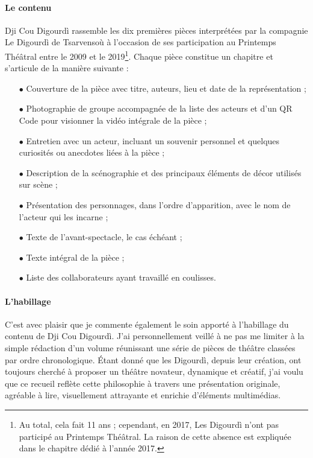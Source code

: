 \paragraph*{Le contenu}
Dji Cou Digourdì rassemble les dix premières pièces interprétées par la compagnie Le Digourdì de Tsarvensoù à l'occasion de ses participation au Printemps Thé\^atral entre le 2009 et le 2019\footnote{ Au total, cela fait 11 ans ; cependant, en 2017, Les Digourdì n'ont pas participé au Printemps Thé\^atral. La raison de cette absence est expliquée dans le chapitre dédié à l'année 2017.}. Chaque pièce constitue un chapitre et s'articule de la manière suivante :
\begin{itemize}
\item[$\bullet$] Couverture de la pièce avec titre, auteurs, lieu et date de la représentation ;
\item[$\bullet$] Photographie de groupe accompagnée de la liste des acteurs et d'un QR Code pour visionner la vidéo intégrale de la pièce ;
\item[$\bullet$] Entretien avec un acteur, incluant un souvenir personnel et quel\-ques curiosités ou anecdotes liées à la pièce ;
\item[$\bullet$] Description de la scénographie et des principaux éléments de décor utilisés sur scène ;
\item[$\bullet$] Présentation des personnages, dans l’ordre d’apparition, avec le nom de l’acteur qui les incarne ;
\item[$\bullet$] Texte de l’avant-spectacle, le cas échéant ;
\item[$\bullet$] Texte intégral de la pièce ;
\item[$\bullet$] Liste des collaborateurs ayant travaillé en coulisses.
\end{itemize}

\paragraph*{L'habillage}
C'est avec plaisir que je commente également le soin apporté à l'habillage du contenu de Dji Cou Digourdì. J'ai personnellement veillé à ne pas me limiter à la simple rédaction d'un volume réunissant une série de pièces de théâtre classées par ordre chronologique. Étant donné que les Digourdì, depuis leur création, ont toujours cherché à proposer un théâtre novateur, dynamique et créatif, j'ai voulu que ce recueil  reflète cette philosophie à travers une présentation originale, agréable à lire, visuellement attrayante et enrichie d’éléments multimédias.


